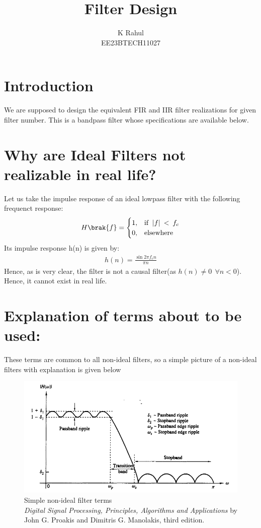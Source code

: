 \documentclass{article}
\begin{document}
\title{ \textbf{Filter Design}}

\author{K Rahul\\EE23BTECH11027}
\date{}

\maketitle
\section{Introduction}
We are supposed to design the equivalent FIR and IIR filter realizations for given filter number.  
This is a bandpass filter whose specifications are available below.
\section{Why are Ideal Filters not realizable in real life?}
Let us take the impulse response of an ideal lowpass filter with the following frequenct response:
\begin{align}
H\brak{f}=
    \begin{cases}
        1, & \text{if }\:|f|\:<\:f_c\\
        0, & \text{elsewhere}
    \end{cases} 
\end{align}
Its impulse response h(n) is given by:
\begin{align}
    h(n) = \frac{\sin{2 \pi f_c n}}{\pi n}
\end{align}
Hence, as is very clear, the filter is not a causal filter(as $h(n) \neq 0 \:\:\forall n<0$). Hence, it cannot exist in real life.
\section{Explanation of terms about to be used:}
These terms are common to all non-ideal filters, so a simple picture of a non-ideal filters with explanation is given below
\begin{figure}[H]
\centering
\includegraphics[width=1\columnwidth]{figs/Non-Ideal-Filter.png}
\caption{Simple non-ideal filter terms\\ \textit{Digital Signal Processing, Principles, Algorithms and Applications} by John G. Proakis and Dimitris G. Manolakis, third edition.}
\label{fig:Non_ideal_filter_terms}
\end{figure}
\end{document}
